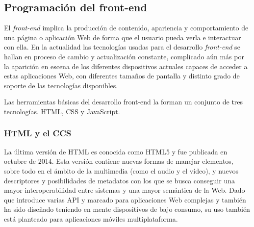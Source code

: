

\subsection{Programación del front-end}

El \emph{front-end} implica la producción de contenido, apariencia y comportamiento de una página o aplicación Web de forma que el usuario pueda verla e interactuar con ella. En la actualidad las tecnologías usadas para el desarrollo \emph{front-end} se hallan en proceso de cambio y actualización constante, complicado aún más por la aparición en escena de los diferentes dispositivos actuales capaces de acceder a estas aplicaciones Web, con diferentes tamaños de pantalla y distinto grado de soporte de las tecnologías disponibles.

Las herramientas básicas del desarrollo front-end la forman un conjunto de tres tecnologías. HTML, CSS y JavaScript.

\subsubsection{HTML y  el CCS}

La última versión de HTML es conocida como HTML5 y fue publicada en octubre de 2014. Esta versión contiene nuevas formas de manejar elementos, sobre todo en el ámbito de la multimedia (como el audio y el vídeo), y nuevos descriptores y posibilidades de metadatos con los que se busca conseguir una mayor interoperabilidad entre sistemas y una mayor semántica de la Web. Dado que introduce varias API y marcado para aplicaciones Web complejas y también ha sido diseñado teniendo en mente dispositivos de bajo consumo, su uso también está planteado para aplicaciones móviles multiplataforma.

